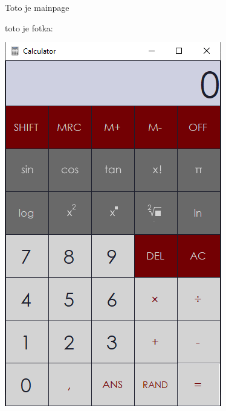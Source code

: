 Toto je mainpage

toto je fotka\+:  
\begin{DoxyImageNoCaption}
  \mbox{\includegraphics[width=\textwidth,height=\textheight/2,keepaspectratio=true]{calculator.png}}
\end{DoxyImageNoCaption}
   
